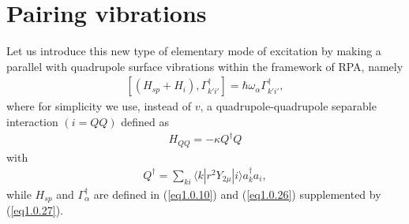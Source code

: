 \documentclass[a4paper,11pt]{book}
\numberwithin{equation}{section}
\numberwithin{figure}{section}
\numberwithin{table}{section}
\newcommand{\braket}[1]{\langle {#1} \rangle }
\begin{document}
\section{Pairing vibrations}
Let us introduce this new type of elementary mode of excitation by making a parallel with quadrupole surface vibrations within the framework of RPA, namely
\begin{align}\label{eq1.0.29}
\left[(H_{sp}+H_i),\Gamma_{k'i'}^\dagger\right]=\hbar\omega_\alpha\Gamma_{k'i'}^\dagger,
\end{align}
where for simplicity we use, instead of $v$, a quadrupole-quadrupole separable interaction $(i=QQ)$ defined as
\begin{align}\label{eq1.0.30}
H_{QQ}=-\kappa Q^\dagger Q
\end{align}
with 
\begin{align}\label{eq1.0.31}
 Q^\dagger=\sum_{ki}\braket{k|r^2 Y_{2\mu}|i}a^\dagger_k a_i,
\end{align}
while $H_{sp}$ and $\Gamma^\dagger_\alpha$ are defined in (\ref{eq1.0.10}) and (\ref{eq1.0.26}) supplemented by (\ref{eq1.0.27}).
\end{document}
